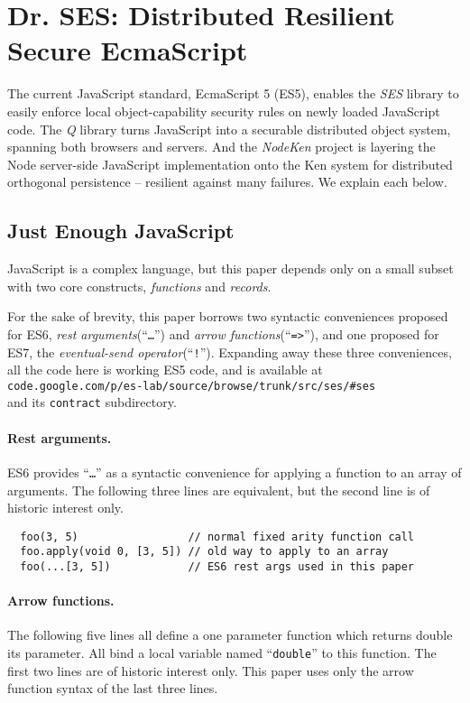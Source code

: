 \documentclass{llncs}
\begin{document}
\section{Dr. SES: Distributed Resilient Secure EcmaScript}

The current JavaScript standard, EcmaScript 5 (ES5), enables the \emph{SES} library to easily enforce local object-capability security rules on newly loaded JavaScript code. The \emph{Q} library turns JavaScript into a securable distributed object system, spanning both browsers and servers. And the \emph{NodeKen} project is layering the Node server-side JavaScript implementation onto the Ken system for distributed orthogonal persistence -- resilient against many failures. We explain each below.

\subsection{Just Enough JavaScript}

JavaScript is a complex language, but this paper depends only on a small subset with two core constructs, \emph{functions} and \emph{records}. 

For the sake of brevity, this paper borrows two syntactic conveniences proposed for ES6, \emph{rest arguments}(``{\tt \ldots}'') and \emph{arrow functions}(``{\tt =>}''), and one proposed for ES7, the \emph{eventual-send operator}(``{\tt !}''). Expanding away these three conveniences, all the code here is working ES5 code, and is available at \\
{\tt code.google.com/p/es-lab/source/browse/trunk/src/ses/\#ses} \\
and its {\tt contract} subdirectory.

\paragraph{Rest arguments.} ES6 provides ``{\tt \ldots}'' as a syntactic convenience for applying a function to an array of arguments. The following three lines are equivalent, but the second line is of historic interest only.

\begin{verbatim}
  foo(3, 5)                 // normal fixed arity function call
  foo.apply(void 0, [3, 5]) // old way to apply to an array
  foo(...[3, 5])            // ES6 rest args used in this paper
\end{verbatim}

\paragraph{Arrow functions.} The following five lines all define a one parameter function which returns double its parameter. All bind a local variable named ``{\tt double}'' to this function. The first two lines are of historic interest only. This paper uses only the arrow function syntax of the last three lines.
\end{document}
